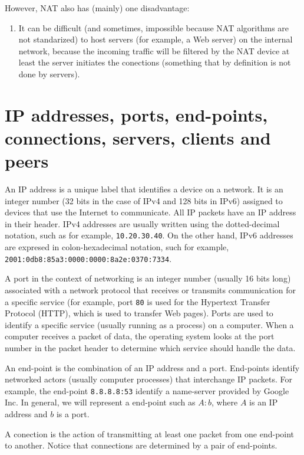 However, NAT also has (mainly) one disadvantage:
\begin{enumerate}
\item It can be difficult (and sometimes, impossible because NAT
  algorithms are not standarized) to host servers (for example, a Web
  server) on the internal network, because the incoming traffic will
  be filtered by the NAT device at least the server initiates the
  conections (something that by definition is not done by servers).
\end{enumerate}

\section{IP addresses, ports, end-points, connections, servers, clients and peers}

An IP address is a unique label that identifies a device on a
network. It is an integer number (32 bits in the case of IPv4 and 128
bits in IPv6) assigned to devices that use the Internet to
communicate. All IP packets have an IP address in their header. IPv4
addresses are usually written using the dotted-decimal notation, such
as for example, \texttt{10.20.30.40}. On the other hand, IPv6
addresses are expresed in colon-hexadecimal notation, such for
example, \texttt{2001:0db8:85a3:0000:0000:8a2e:0370:7334}.

A port in the context of networking is an integer number (usually 16
bits long) associated with a network protocol that receives or
transmits communication for a specific service (for example, port
\texttt{80} is used for the Hypertext Transfer Protocol (HTTP), which
is used to transfer Web pages). Ports are used to identify a specific
service (usually running as a process) on a computer. When a computer
receives a packet of data, the operating system looks at the port
number in the packet header to determine which service should handle
the data.

An end-point is the combination of an IP address and a
port. End-points identify networked actors (usually computer
processes) that interchange IP packets. For example, the end-point
\texttt{8.8.8.8:53} identify a name-server provided by Google Inc. In
general, we will represent a end-point such as $A:b$, where $A$ is an
IP address and $b$ is a port.

A conection is the action of transmitting at least one packet from one
end-point to another. Notice that connections are determined by a pair
of end-points.

